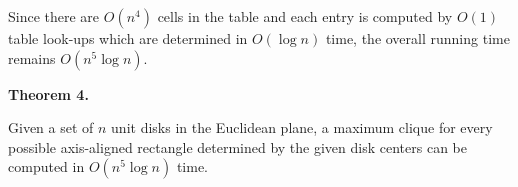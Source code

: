 \documentclass[10pt,a4paper]{amsart}
\begin{document}
\par
Since there are $O(n^{4})$ cells in the table and each entry is computed by $O(1)$ table look-ups which are determined in $O(\log n)$ time, the overall running time remains $O(n^{5}\log n)$.
\par
\par

\par\medskip\noindent\textbf{Theorem 4.}\par
Given a set of $n$ unit disks in the Euclidean plane, a maximum clique for every possible axis-aligned rectangle determined by the given disk centers can be computed in $O(n^{5}\log n)$ time.
\par
\par
\par
\end{document}
